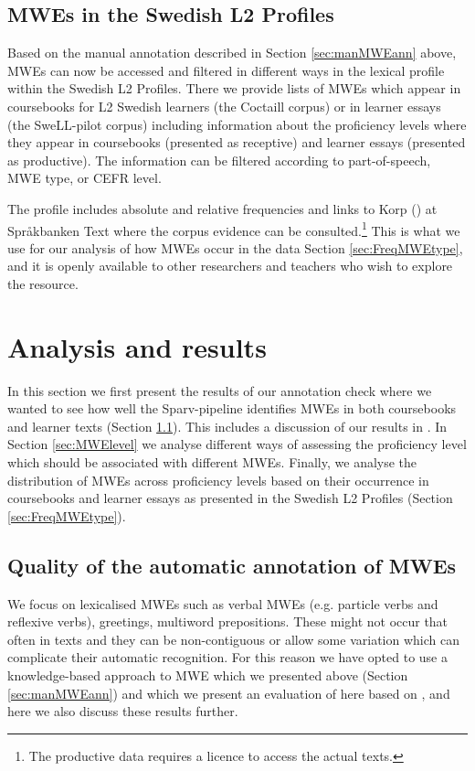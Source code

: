 \documentclass[output=paper,colorlinks,citecolor=brown]{langscibook}
\begin{document}
\subsection{MWEs in the Swedish L2 Profiles}\label{sec:MWESweL2P}
Based on the manual annotation described in Section \ref{sec:manMWEann} above, MWEs can now be accessed and filtered in different ways in the lexical profile within the Swedish L2 Profiles. %
There we provide lists of MWEs which appear in coursebooks for L2 Swedish learners (the Coctaill corpus) or in learner essays (the SweLL-pilot corpus) including information about the proficiency levels where they appear in coursebooks (presented as receptive) and learner essays (presented as productive). The information can be filtered according to part-of-speech, MWE type, or CEFR level.  

The profile includes absolute and relative frequencies and links to Korp (\cite{borin2012korp}) at Språkbanken Text where the corpus evidence can be consulted.\footnote{The productive data requires a licence to access the actual texts.} This is what we use for our analysis of how MWEs occur in the data Section \ref{sec:FreqMWEtype}, and it is openly available to other researchers and teachers who wish to explore the resource.

\section{Analysis and results}\label{sec:Analysis}

In this section we first present the results of our annotation check where we wanted to see how well the Sparv-pipeline identifies MWEs in both coursebooks and learner texts (Section \ref{sec:AutoAnnMWE}). 
This includes a discussion of our results 
in \citet{volodina2022annotation}. In Section \ref{sec:MWElevel} we analyse different ways of assessing the proficiency level which should be associated with different MWEs.
Finally, we analyse the distribution of MWEs across proficiency levels based on their occurrence in coursebooks and learner essays as presented in the Swedish L2 Profiles (Section \ref{sec:FreqMWEtype}). 

\subsection{Quality of the automatic annotation of MWEs}\label{sec:AutoAnnMWE}
We focus on lexicalised MWEs such as verbal MWEs (e.g. particle verbs and reflexive verbs), greetings, multiword prepositions. These might not occur that often in texts and they can be non-contiguous or allow some variation which can complicate their automatic recognition. For this reason we have opted to use a knowledge-based approach to MWE which we presented above   
(Section \ref{sec:manMWEann}) and which we present an evaluation of here based on \citet{volodina2022annotation}, and here we also discuss these results further.
\end{document}
